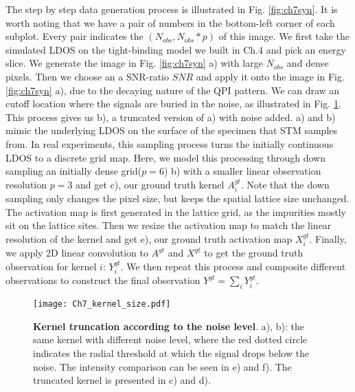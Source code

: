 The step by step data generation process is illustrated in Fig. \ref{fig:ch7syn}. It is worth noting that we have a pair of numbers in the bottom-left corner of each subplot. Every pair indicates the $(N_{obs}, N_{obs}*p)$ of this image. We first take the simulated \ac{LDOS} on the tight-binding model we built in Ch.4 and pick an energy slice. We generate the image in Fig. \ref{fig:ch7syn} a) with large $N_{obs}$ and dense pixels. Then we choose an a SNR-ratio $SNR$ and apply it onto the image in Fig. \ref{fig:ch7syn} a), due to the decaying nature of the \ac{QPI} pattern. We can draw an cutoff location where the signals are buried in the noise, as illustrated in Fig. \ref{fig:ch7_kernel_size}. This process gives us b), a truncated version of a) with noise added. a) and b) mimic the underlying \ac{LDOS} on the surface of the specimen that \ac{STM} samples from. In real experiments, this sampling process turns the initially continuous \ac{LDOS} to a discrete grid map. Here, we model this processing through down sampling an initially dense grid($p=6$) b) with a smaller linear observation resolution $p=3$ and get c), our ground truth kernel $A^{gt}_i$. Note that the down sampling only changes the pixel size, but keeps the spatial lattice size unchanged. The activation map is first generated in the lattice grid, as the impurities mostly sit on the lattice sites. Then we resize the activation map to match the linear resolution of the kernel and get e), our ground truth activation map $X^{gt}_i$. Finally, we apply 2D linear convolution to $A^{gt}$ and $X^{gt}$ to get the ground truth observation for kernel $i$: $Y^{gt}_i$. We then repeat this process and composite different observations to construct the final observation $Y^{gt}= \sum_iY^{gt}_i$. 

\begin{figure}
	\texttt{[image: Ch7\_kernel\_size.pdf]} 
	\centering
	\caption[\textbf{Kernel truncation according to the noise level}]{\textbf{Kernel truncation according to the noise level}. a), b): the same kernel with different noise level, where the red dotted circle indicates the radial threshold at which the signal drops below the noise. The intensity comparison can be seen in e) and f). The truncated kernel is presented in c) and d).}
	\label{fig:ch7_kernel_size}
\end{figure}

